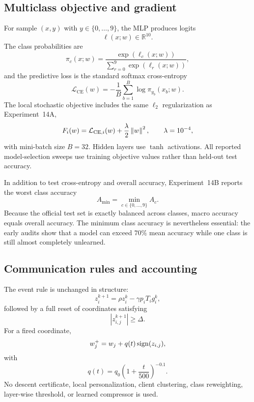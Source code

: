 \subsection{Multiclass objective and gradient}

For sample $(x,y)$ with $y\in\{0,\ldots,9\}$, the MLP produces logits
\begin{equation}
\ell(x;w)\in\mathbb{R}^{10}.
\end{equation}
The class probabilities are
\begin{equation}
\pi_c(x;w)=
\frac{\exp(\ell_c(x;w))}
{\sum_{r=0}^{9}\exp(\ell_r(x;w))},
\end{equation}
and the predictive loss is the standard softmax cross-entropy
\begin{equation}
\mathcal{L}_{\mathrm{CE}}(w)
=-\frac{1}{B}\sum_{b=1}^{B}
\log \pi_{y_b}(x_b;w).
\end{equation}
The local stochastic objective includes the same $\ell_2$ regularization as Experiment~14A,
\begin{equation}
F_i(w)=\mathcal{L}_{\mathrm{CE},i}(w)+\frac{\lambda}{2}\left\lVert w\right\rVert^2,
\qquad \lambda=10^{-4},
\end{equation}
with mini-batch size $B=32$. Hidden layers use $\tanh$ activations. All reported model-selection sweeps use training objective values rather than held-out test accuracy.

In addition to test cross-entropy and overall accuracy, Experiment~14B reports the worst class accuracy
\begin{equation}
A_{\min}=\min_{c\in\{0,\ldots,9\}} A_c.
\end{equation}
Because the official test set is exactly balanced across classes, macro accuracy equals overall accuracy. The minimum class accuracy is nevertheless essential: the early audits show that a model can exceed $70\%$ mean accuracy while one class is still almost completely unlearned.

\subsection{Communication rules and accounting}

The event rule is unchanged in structure:
\begin{equation}
z_i^{k+1}=\rho z_i^k-\gamma p_iT_i g_i^k,
\end{equation}
followed by a full reset of coordinates satisfying
\begin{equation}
|z_{i,j}^{k+1}|\ge\Delta.
\end{equation}
For a fired coordinate,
\begin{equation}
w_j^+=w_j+q(t)\operatorname{sign}(z_{i,j}),
\end{equation}
with
\begin{equation}
q(t)=q_0\left(1+\frac{t}{500}\right)^{-0.1}.
\end{equation}
No descent certificate, local personalization, client clustering, class reweighting, layer-wise threshold, or learned compressor is used.

